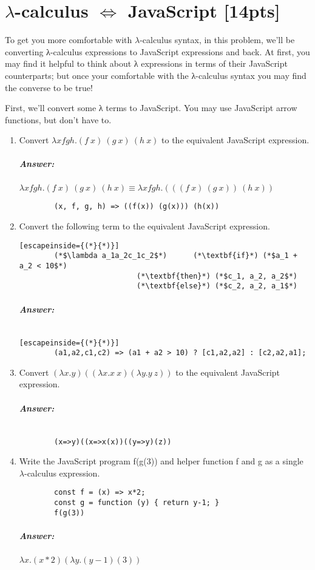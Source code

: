 \documentclass{article}
\begin{document}
\section{$\lambda$-calculus $\Leftrightarrow$ JavaScript [14pts]}
To get you more comfortable with $\lambda$-calculus syntax, in this problem, we’ll be
converting λ-calculus expressions
to JavaScript expressions and back. At first, you may find it helpful to think
about λ expressions in terms
of their JavaScript counterparts; but once your comfortable with the λ-calculus
syntax you may find the
converse to be true!
\par First, we’ll convert some λ terms to JavaScript. You may use JavaScript arrow
functions, but don’t have
to.

\begin{enumerate}[label=\textbf{\arabic*}.]
	\item Convert $\lambda xfgh.(f\ x)\ (g\ x)\ (h\ x)$ to the equivalent JavaScript
	expression.
	\subparagraph{Answer: }
		$\lambda xfgh.(f\ x)\ (g\ x)\ (h\ x) \equiv \lambda xfgh.(((f\ x)\ (g\ x))\ (h\ x))$
		\begin{lstlisting}
		(x, f, g, h) => ((f(x)) (g(x))) (h(x))
		\end{lstlisting}

	\item Convert the following term to the equivalent JavaScript expression.
		\begin{lstlisting}[escapeinside={(*}{*)}]
		(*$\lambda a_1a_2c_1c_2$*)		(*\textbf{if}*) (*$a_1 + a_2 < 10$*)
						   (*\textbf{then}*) (*$c_1, a_2, a_2$*)
						   (*\textbf{else}*) (*$c_2, a_2, a_1$*)
		\end{lstlisting}

		\subparagraph{Answer: } $\quad$
		\begin{lstlisting}[escapeinside={(*}{*)}]
		(a1,a2,c1,c2) => (a1 + a2 > 10) ? [c1,a2,a2] : [c2,a2,a1];
		\end{lstlisting}
	
	\item Convert $(\lambda x.y)((\lambda x.x\ x)(\lambda y.y\ z))$ to the
		equivalent JavaScript expression.
		\subparagraph{Answer: } $\quad$
		\begin{lstlisting}
		(x=>y)((x=>x(x))((y=>y)(z))
		\end{lstlisting}

	\item Write the JavaScript program f(g(3)) and helper function f and g as a
		single $\lambda$-calculus expression.
		\begin{lstlisting}
		const f = (x) => x*2;
		const g = function (y) { return y-1; }
		f(g(3))
		\end{lstlisting}

		\subparagraph{Answer: } $\lambda x.(x*2) (\lambda y.(y-1) (3))$

\end{enumerate}
\end{document}
